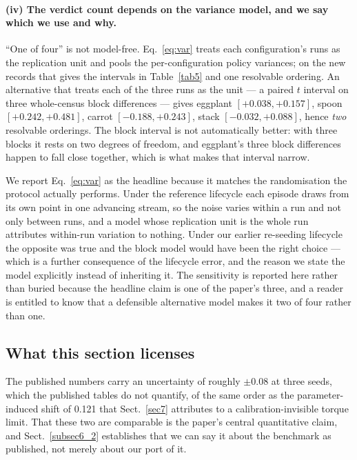 \documentclass[pdflatex,iicol,sn-apa]{sn-jnl}
\theoremstyle{remark}
\begin{document}
\paragraph{(iv) The verdict count depends on the variance model, and we say which we use and why.}
``One of four'' is not model-free. Eq.~\eqref{eq:var} treats each configuration's runs as the
replication unit and pools the per-configuration policy variances; on the new records that gives the
intervals in Table~\ref{tab5} and one resolvable ordering. An alternative that treats each of the
three runs as the unit --- a paired $t$ interval on three whole-census block differences --- gives
eggplant $[+0.038, +0.157]$, spoon $[+0.242, +0.481]$, carrot $[-0.188, +0.243]$, stack
$[-0.032, +0.088]$, hence \emph{two} resolvable orderings. The block interval is not automatically
better: with three blocks it rests on two degrees of freedom, and eggplant's three block differences
happen to fall close together, which is what makes that interval narrow.

We report Eq.~\eqref{eq:var} as the headline because it matches the randomisation the protocol
actually performs. Under the reference lifecycle each episode draws from its own point in one
advancing stream, so the noise varies within a run and not only between runs, and a model whose
replication unit is the whole run attributes within-run variation to nothing. Under our earlier
re-seeding lifecycle the opposite was true and the block model would have been the right choice ---
which is a further consequence of the lifecycle error, and the reason we state the model explicitly
instead of inheriting it. The sensitivity is reported here rather than buried because the headline
claim is one of the paper's three, and a reader is entitled to know that a defensible alternative
model makes it two of four rather than one.

\subsection{What this section licenses}\label{subsec6_4}

The published numbers carry an uncertainty of roughly $\pm 0.08$ at three seeds, which the published
tables do not quantify, of the
same order as the parameter-induced shift of 0.121 that Sect.~\ref{sec7} attributes to a
calibration-invisible torque limit. That these two are comparable is the paper's central quantitative
claim, and Sect.~\ref{subsec6_2} establishes that we can say it about the benchmark as published, not
merely about our port of it.
\end{document}
